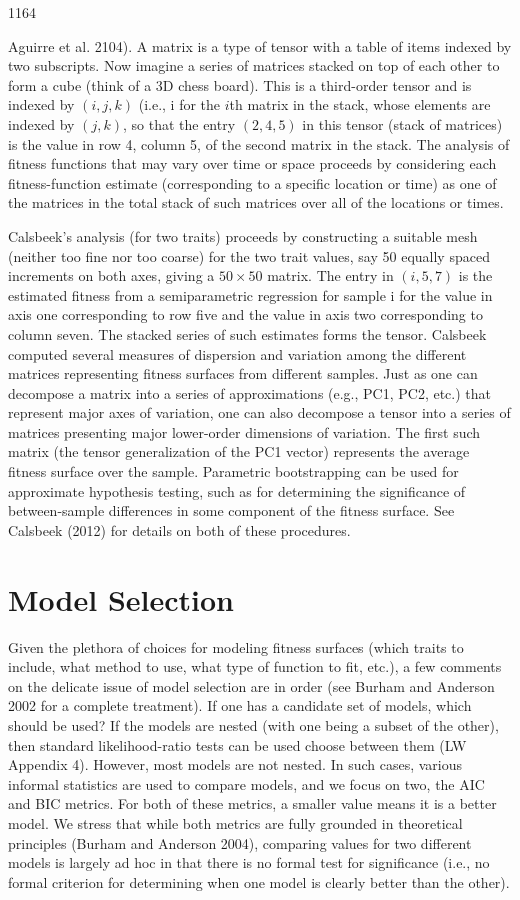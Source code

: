 \documentclass{article}
\begin{document}
1164

Aguirre et al. 2104). A matrix is a type of tensor with a table of items indexed by two subscripts. Now imagine a series of matrices stacked on top of each other to form a cube (think of a 3D chess board). This is a third-order tensor and is indexed by  $ (i, j, k) $ (i.e., i for the  $ i $th matrix in the stack, whose elements are indexed by  $ (j, k) $, so that the entry  $ (2, 4, 5) $ in this tensor (stack of matrices) is the value in row 4, column 5, of the second matrix in the stack. The analysis of fitness functions that may vary over time or space proceeds by considering each fitness-function estimate (corresponding to a specific location or time) as one of the matrices in the total stack of such matrices over all of the locations or times.

Calsbeek’s analysis (for two traits) proceeds by constructing a suitable mesh (neither too fine nor too coarse) for the two trait values, say 50 equally spaced increments on both axes, giving a  $ 50 \times 50 $ matrix. The entry in  $ (i, 5, 7) $ is the estimated fitness from a semiparametric regression for sample i for the value in axis one corresponding to row five and the value in axis two corresponding to column seven. The stacked series of such estimates forms the tensor. Calsbeek computed several measures of dispersion and variation among the different matrices representing fitness surfaces from different samples. Just as one can decompose a matrix into a series of approximations (e.g., PC1, PC2, etc.) that represent major axes of variation, one can also decompose a tensor into a series of matrices presenting major lower-order dimensions of variation. The first such matrix (the tensor generalization of the PC1 vector) represents the average fitness surface over the sample. Parametric bootstrapping can be used for approximate hypothesis testing, such as for determining the significance of between-sample differences in some component of the fitness surface. See Calsbeek (2012) for details on both of these procedures.

\section{Model Selection}
Given the plethora of choices for modeling fitness surfaces (which traits to include, what method to use, what type of function to fit, etc.), a few comments on the delicate issue of model selection are in order (see Burham and Anderson 2002 for a complete treatment). If one has a candidate set of models, which should be used? If the models are nested (with one being a subset of the other), then standard likelihood-ratio tests can be used choose between them (LW Appendix 4). However, most models are not nested. In such cases, various informal statistics are used to compare models, and we focus on two, the AIC and BIC metrics. For both of these metrics, a smaller value means it is a better model. We stress that while both metrics are fully grounded in theoretical principles (Burham and Anderson 2004), comparing values for two different models is largely ad hoc in that there is no formal test for significance (i.e., no formal criterion for determining when one model is clearly better than the other).
\end{document}
